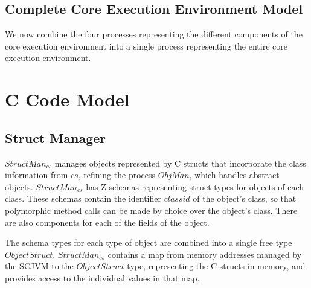



\subsection{Complete Core Execution Environment Model}
\label{complete-cee-subsection}

We now combine the four \Circus{} processes representing the different
components of the core execution environment into a single \Circus{}
process representing the entire core execution environment.



\section{C Code Model}
\label{cee-c-code-section}

\subsection{Struct Manager}
\label{cee-struct-manager-subsection}

$StructMan_{cs}$ manages objects represented by C structs that
incorporate the class information from $cs$, refining the process
$ObjMan$, which handles abstract objects.
$StructMan_{cs}$ has Z schemas representing struct types for objects
of each class.
%
%
These schemas contain the identifier $classid$ of the object's class, so
that polymorphic method calls can be made by choice over the object's
class. 
There are also components for each of the fields of the
object.

The schema types for each type of object are combined into a single
free type $ObjectStruct$.
$StructMan_{cs}$ contains a map from memory addresses managed by the
SCJVM to the $ObjectStruct$ type, representing the C structs in
memory, and provides access to the individual values in that map.

